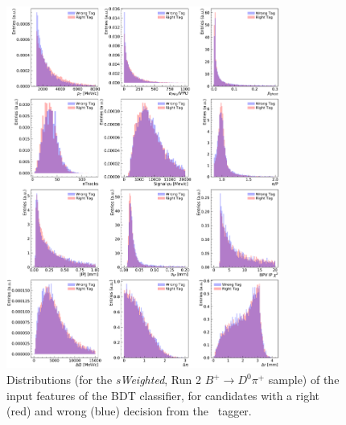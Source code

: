 \begin{figure}[htbp]
        \begin{center}
        \includegraphics[width=0.8\textwidth]{04Flavourtagging/figs/OSelectronOpt/2018-04-07-vibattis-OSElectron-bdt-calibration-sWeights_Run2_Bu2D0pi/FeaturesDistribution_RunIIcuts.pdf}
        \end{center}
        \vspace{-2mm}
        \caption{Distributions (for the \emph{sWeighted}, Run 2 $B^+\to D^0 \pi^+$ sample) of the input features of the BDT classifier, for candidates with a right (red) and wrong (blue) decision from the \OSe~tagger.}
         \label{fig:OSefeaturesRunIIB2OC}
\end{figure}

